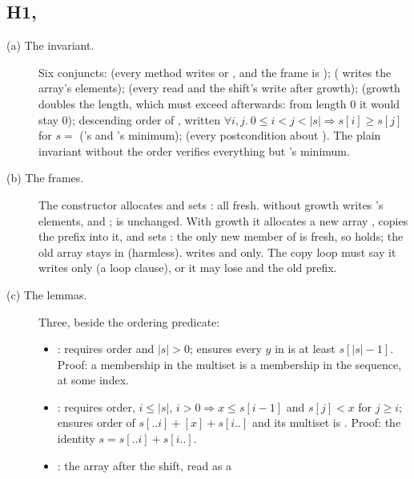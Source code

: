 \documentclass[11pt]{article}
\begin{document}
\subsection*{H1, }
\begin{description}
\item[(a) The invariant.] Six conjuncts:
   (every method writes  or , and the
  frame is );
   ( writes the array's elements);
   (every read  and the shift's write
   after growth);
   (growth doubles the length, which must exceed 
  afterwards: from length 0 it would stay 0);
  descending order of , written
  $\forall i, j.\ 0 \le i < j < |s| \Rightarrow s[i] \ge s[j]$ for
  $s = $  ('s and 's minimum);
   (every postcondition about ).
  The plain invariant without the order verifies everything but
  's minimum.
\item[(b) The frames.] The constructor allocates  and sets
  : all fresh.  without growth writes
  's elements,  and ;  is unchanged. With
  growth it allocates a new array , copies the prefix into it, and sets
  : the only new member of  is
  fresh, so  holds; the old array stays in
   (harmless).  writes  and  only.
  The copy loop must say it writes only  (a loop 
  clause), or it may lose  and the old prefix.
\item[(c) The lemmas.] Three, beside the ordering predicate:
  \begin{itemize}
  \item {}: requires order and $|s| > 0$; ensures every
    $y$ in  is at least $s[|s| - 1]$. Proof: a membership
    in the multiset is a membership in the sequence, at some index.
  \item {}: requires order, $i \le |s|$,
    $i > 0 \Rightarrow x \le s[i - 1]$ and $s[j] < x$ for $j \ge i$;
    ensures order of $s[..i] + [x] + s[i..]$ and its multiset is
    . Proof: the identity
    $s = s[..i] + s[i..]$.
  \item {}: the array after the shift, read as a

\end{itemize}
\end{description}
\end{document}
